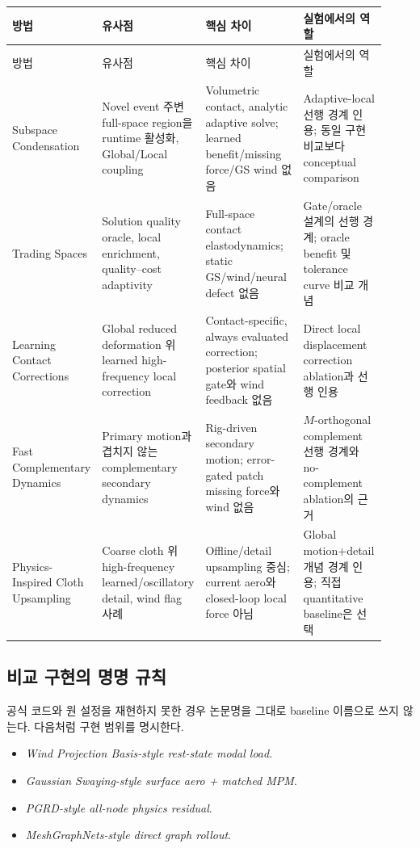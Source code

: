 \documentclass[11pt,a4paper]{article}
\begin{document}
\begin{longtable}{L{0.16\linewidth}L{0.23\linewidth}L{0.30\linewidth}L{0.23\linewidth}}
\toprule
방법 & 유사점 & 핵심 차이 & 실험에서의 역할 \\
\midrule
\endfirsthead
\toprule
방법 & 유사점 & 핵심 차이 & 실험에서의 역할 \\
\midrule
\endhead
Subspace Condensation \cite{teng2015condensation}
& Novel event 주변 full-space region을 runtime 활성화, Global/Local coupling
& Volumetric contact, analytic adaptive solve; learned benefit/missing force/GS wind 없음
& Adaptive-local 선행 경계 인용; 동일 구현 비교보다 conceptual comparison \\
\addlinespace
Trading Spaces \cite{trusty2024tradingspaces}
& Solution quality oracle, local enrichment, quality--cost adaptivity
& Full-space contact elastodynamics; static GS/wind/neural defect 없음
& Gate/oracle 설계의 선행 경계; oracle benefit 및 tolerance curve 비교 개념 \\
\addlinespace
Learning Contact Corrections \cite{romero2021contact}
& Global reduced deformation 위 learned high-frequency local correction
& Contact-specific, always evaluated correction; posterior spatial gate와 wind feedback 없음
& Direct local displacement correction ablation과 선행 인용 \\
\addlinespace
Fast Complementary Dynamics \cite{benchekroun2023complementary}
& Primary motion과 겹치지 않는 complementary secondary dynamics
& Rig-driven secondary motion; error-gated patch missing force와 wind 없음
& \(M\)-orthogonal complement 선행 경계와 no-complement ablation의 근거 \\
\addlinespace
Physics-Inspired Cloth Upsampling \cite{kavan2011upsampling}
& Coarse cloth 위 high-frequency learned/oscillatory detail, wind flag 사례
& Offline/detail upsampling 중심; current aero와 closed-loop local force 아님
& Global motion+detail 개념 경계 인용; 직접 quantitative baseline은 선택 \\
\bottomrule
\end{longtable}

\subsection{비교 구현의 명명 규칙}

공식 코드와 원 설정을 재현하지 못한 경우 논문명을 그대로 baseline 이름으로 쓰지 않는다.
다음처럼 구현 범위를 명시한다.

\begin{itemize}[leftmargin=1.5em]
  \item \emph{Wind Projection Basis-style rest-state modal load}.
  \item \emph{Gaussian Swaying-style surface aero + matched MPM}.
  \item \emph{PGRD-style all-node physics residual}.
  \item \emph{MeshGraphNets-style direct graph rollout}.
\end{itemize}
\end{document}
